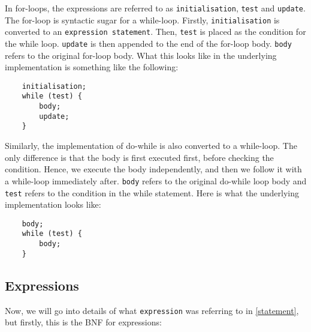 \documentclass[a4paper]{article}
\begin{document}
In for-loops, the expressions are referred to as \texttt{initialisation}, \texttt{test} and \texttt{update}. The for-loop is syntactic sugar for a while-loop. Firstly, \texttt{initialisation} is converted to an \texttt{expression statement}. Then, \texttt{test} is placed as the condition for the while loop. \texttt{update} is then appended to the end of the for-loop body. \texttt{body} refers to the original for-loop body. What this looks like in the underlying implementation is something like the following:


\begin{verbatim}
	initialisation;
	while (test) {
		body;
		update;
	}
\end{verbatim}

Similarly, the implementation of do-while is also converted to a while-loop. The only difference is that the body is first executed first, before checking the condition. Hence, we execute the body independently, and then we follow it with a while-loop immediately after. \texttt{body} refers to the original do-while loop body and \texttt{test} refers to the condition in the while statement. Here is what the underlying implementation looks like:

\begin{verbatim}
	body;
	while (test) {
		body;
	}
\end{verbatim}

\subsection{Expressions}

Now, we will go into  details of what \texttt{expression} was referring to in \ref{statement}, but firstly, this is the BNF for expressions:
\end{document}
